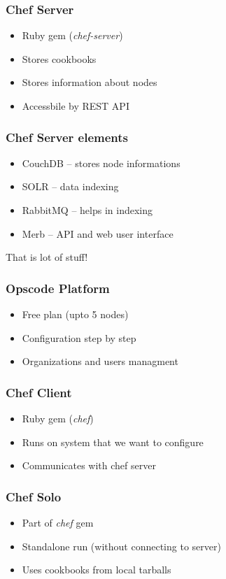 \documentclass[16pt]{beamer}
\begin{document}
\begin{frame}
  \frametitle{Chef Server}
  \begin{itemize}
    \item Ruby gem (\emph{chef-server})
    \item Stores cookbooks
    \item Stores information about nodes
    \item Accessbile by REST API
  \end{itemize}
\end{frame}

\begin{frame}
  \frametitle{Chef Server elements}
  \begin{itemize}
    \item CouchDB -- stores node informations
    \item SOLR -- data indexing
    \item RabbitMQ -- helps in indexing
    \item Merb -- API and web user interface
  \end{itemize}
  \pause
  \begin{center}
    \LARGE \color{red} That is lot of stuff!
  \end{center}
\end{frame}

\begin{frame}
  \frametitle{Opscode Platform}
  \begin{itemize}
    \item Free plan (upto 5 nodes)
    \item Configuration step by step
    \item Organizations and users managment
  \end{itemize}
\end{frame}

\begin{frame}
  \frametitle{Chef Client}
  \begin{itemize}
    \item Ruby gem (\emph{chef})
    \item Runs on system that we want to configure
    \item Communicates with chef server
  \end{itemize}
\end{frame}

\begin{frame}
  \frametitle{Chef Solo}
  \begin{itemize}
    \item Part of \emph{chef} gem
    \item Standalone run (without connecting to server)
    \item Uses cookbooks from local tarballs
  \end{itemize}
\end{frame}
\end{document}
